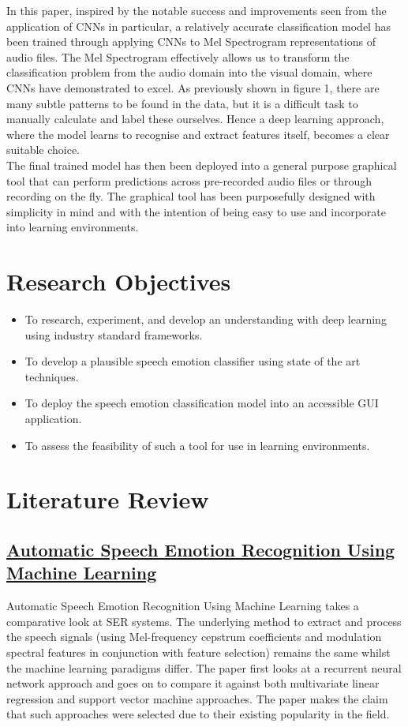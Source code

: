 \documentclass[12pt]{article}
\begin{document}
\noindent In this paper, inspired by the notable success and improvements seen from the application of CNNs in particular, a relatively accurate classification model has been trained through applying CNNs to Mel Spectrogram representations of audio files. The Mel Spectrogram effectively allows us to transform the classification problem from the audio domain into the visual domain, where CNNs have demonstrated to excel. As previously shown in figure 1, there are many subtle patterns to be found in the data, but it is a difficult task to manually calculate and label these ourselves. Hence a deep learning approach, where the model learns to recognise and extract features itself, becomes a clear suitable choice.
\\

\noindent The final trained model has then been deployed into a general purpose graphical tool that can perform predictions across pre-recorded audio files or through recording on the fly. The graphical tool has been purposefully designed with simplicity in mind and with the intention of being easy to use and incorporate into learning environments.
\section{Research Objectives}
\begin{itemize}
\item To research, experiment, and develop an understanding with deep learning using industry standard frameworks.
\item To develop a plausible speech emotion classifier using state of the art techniques.
\item To deploy the speech emotion classification model into an accessible GUI application.
\item To assess the feasibility of such a tool for use in learning environments.
\end{itemize}

\section{Literature Review}

\subsection{\href{https://www.intechopen.com/books/social-media-and-machine-learning/automatic-speech-emotion-recognition-using-machine-learning}{Automatic Speech Emotion Recognition Using Machine Learning}}
Automatic Speech Emotion Recognition Using Machine Learning takes a comparative look at SER systems. The underlying method to extract and process the speech signals (using Mel-frequency cepstrum coefficients and modulation spectral features in conjunction with feature selection) remains the same whilst the machine learning paradigms differ. The paper first looks at a recurrent neural network approach and goes on to compare it against both multivariate linear regression and support vector machine approaches. The paper makes the claim that such approaches were selected due to their existing popularity in the field. 
\\
\end{document}
